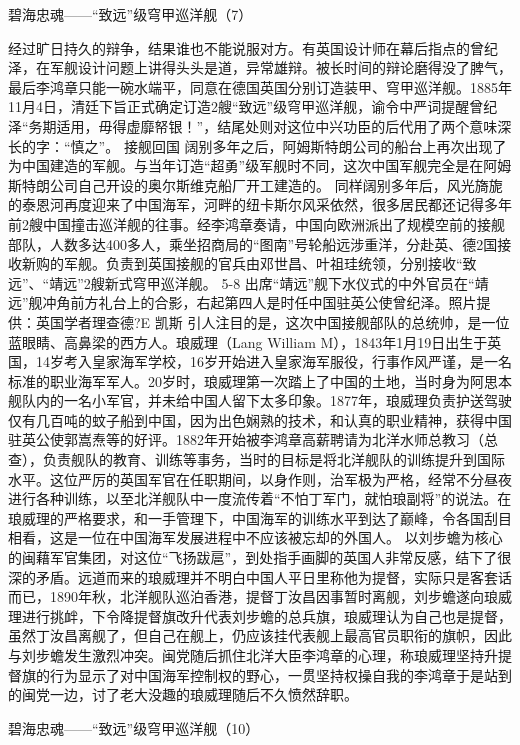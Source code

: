 \documentclass[12pt,UTF8]{ctexbook}
\begin{document}
碧海忠魂——“致远”级穹甲巡洋舰（7）

经过旷日持久的辩争，结果谁也不能说服对方。有英国设计师在幕后指点的曾纪泽，在军舰设计问题上讲得头头是道，异常雄辩。被长时间的辩论磨得没了脾气，最后李鸿章只能一碗水端平，同意在德国英国分别订造装甲、穹甲巡洋舰。1885年11月4日，清廷下旨正式确定订造2艘“致远”级穹甲巡洋舰，谕令中严词提醒曾纪泽“务期适用，毋得虚靡帑银！”，结尾处则对这位中兴功臣的后代用了两个意味深长的字：“慎之”。
接舰回国
阔别多年之后，阿姆斯特朗公司的船台上再次出现了为中国建造的军舰。与当年订造“超勇”级军舰时不同，这次中国军舰完全是在阿姆斯特朗公司自己开设的奥尔斯维克船厂开工建造的。
同样阔别多年后，风光旖旎的泰恩河再度迎来了中国海军，河畔的纽卡斯尔风采依然，很多居民都还记得多年前2艘中国撞击巡洋舰的往事。经李鸿章奏请，中国向欧洲派出了规模空前的接舰部队，人数多达400多人，乘坐招商局的“图南”号轮船远涉重洋，分赴英、德2国接收新购的军舰。负责到英国接舰的官兵由邓世昌、叶祖珪统领，分别接收“致远”、“靖远”2艘新式穹甲巡洋舰。
5-8
出席“靖远”舰下水仪式的中外官员在“靖远”舰冲角前方礼台上的合影，右起第四人是时任中国驻英公使曾纪泽。照片提供：英国学者理查德?E 凯斯
引人注目的是，这次中国接舰部队的总统帅，是一位蓝眼睛、高鼻梁的西方人。琅威理（Lang William M），1843年1月19日出生于英国，14岁考入皇家海军学校，16岁开始进入皇家海军服役，行事作风严谨，是一名标准的职业海军军人。20岁时，琅威理第一次踏上了中国的土地，当时身为阿思本舰队内的一名小军官，并未给中国人留下太多印象。1877年，琅威理负责护送驾驶仅有几百吨的蚊子船到中国，因为出色娴熟的技术，和认真的职业精神，获得中国驻英公使郭嵩焘等的好评。1882年开始被李鸿章高薪聘请为北洋水师总教习（总查），负责舰队的教育、训练等事务，当时的目标是将北洋舰队的训练提升到国际水平。这位严厉的英国军官在任职期间，以身作则，治军极为严格，经常不分昼夜进行各种训练，以至北洋舰队中一度流传着“不怕丁军门，就怕琅副将”的说法。在琅威理的严格要求，和一手管理下，中国海军的训练水平到达了巅峰，令各国刮目相看，这是一位在中国海军发展进程中不应该被忘却的外国人。
以刘步蟾为核心的闽藉军官集团，对这位“飞扬跋扈”，到处指手画脚的英国人非常反感，结下了很深的矛盾。远道而来的琅威理并不明白中国人平日里称他为提督，实际只是客套话而已，1890年秋，北洋舰队巡泊香港，提督丁汝昌因事暂时离舰，刘步蟾遂向琅威理进行挑衅，下令降提督旗改升代表刘步蟾的总兵旗，琅威理认为自己也是提督，虽然丁汝昌离舰了，但自己在舰上，仍应该挂代表舰上最高官员职衔的旗帜，因此与刘步蟾发生激烈冲突。闽党随后抓住北洋大臣李鸿章的心理，称琅威理坚持升提督旗的行为显示了对中国海军控制权的野心，一贯坚持权操自我的李鸿章于是站到的闽党一边，讨了老大没趣的琅威理随后不久愤然辞职。




碧海忠魂——“致远”级穹甲巡洋舰（10）
\end{document}
